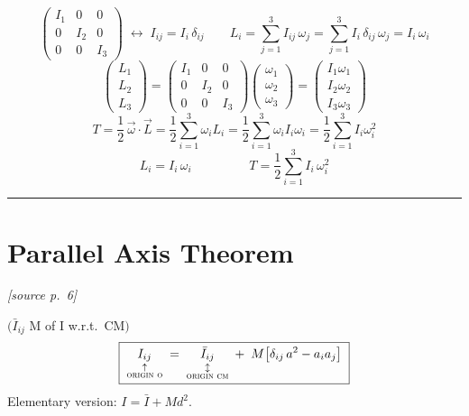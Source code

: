 \documentclass[11pt]{article}
\newcommand{\src}[1]{\par\nobreak\vspace{-4pt}\hfill{\footnotesize\itshape[source p.~#1]}\par\nobreak\vspace{2pt}}
\begin{document}
\begin{equation*}
\begin{pmatrix} I_1 & 0 & 0\\ 0 & I_2 & 0\\ 0 & 0 & I_3\end{pmatrix}
\;\longleftrightarrow\;
I_{ij} = I_i\,\delta_{ij}
\qquad
L_i = \sum_{j=1}^{3} I_{ij}\,\omega_j = \sum_{j=1}^{3} I_i\,\delta_{ij}\,\omega_j = I_i\,\omega_i
\end{equation*}
\begin{equation*}
\begin{pmatrix} L_1\\ L_2\\ L_3\end{pmatrix}
= \begin{pmatrix} I_1 & 0 & 0\\ 0 & I_2 & 0\\ 0 & 0 & I_3\end{pmatrix}
\begin{pmatrix}\omega_1\\ \omega_2\\ \omega_3\end{pmatrix}
= \begin{pmatrix} I_1\omega_1\\ I_2\omega_2\\ I_3\omega_3\end{pmatrix}
\end{equation*}
\begin{equation*}
T = \frac{1}{2}\,\vec{\omega}\cdot\vec{L}
= \frac{1}{2}\sum_{i=1}^{3}\omega_i L_i
= \frac{1}{2}\sum_{i=1}^{3}\omega_i I_i \omega_i
= \frac{1}{2}\sum_{i=1}^{3} I_i \omega_i^{2}
\end{equation*}
\begin{equation*}
\boxed{\;L_i = I_i\,\omega_i\;}
\qquad\qquad
\boxed{\;T = \frac{1}{2}\sum_{i=1}^{3} I_i\,\omega_i^{2}\;}
\end{equation*}

\bigskip\hrule\bigskip

\section*{Parallel Axis Theorem}
\src{6}

$\bigl(\bar{I}_{ij}$ M of I w.r.t.\ CM$\bigr)$
\begin{equation*}
\boxed{\;
\underset{\substack{\uparrow\\ \textsc{origin o}}}{I_{ij}}
\;=\;
\underset{\substack{\updownarrow\\ \textsc{origin cm}}}{\bar{I}_{ij}}
\;+\; M\bigl[\delta_{ij}\,a^{2} - a_i a_j\bigr]\;}
\end{equation*}
Elementary version: $I = \bar{I} + M d^{2}$.
\end{document}

